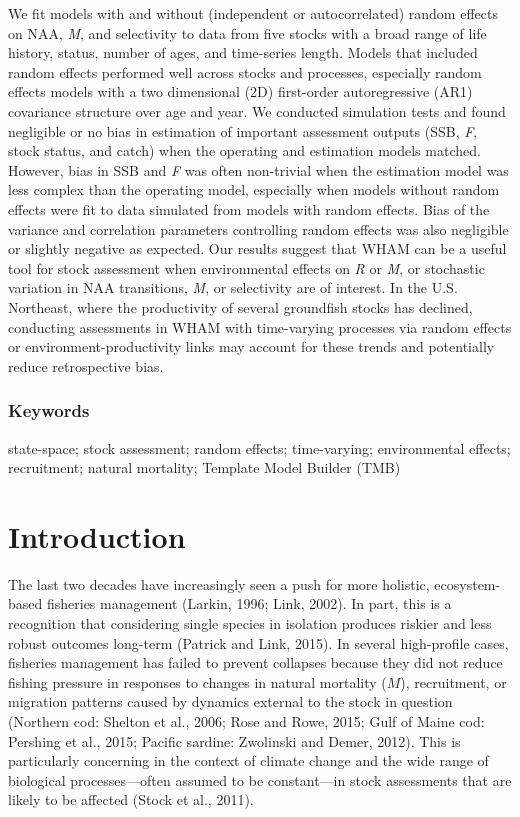 \documentclass[]{article}
\begin{document}
We fit models with and without (independent or autocorrelated) random
effects on NAA, \emph{M}, and selectivity to data from five stocks with
a broad range of life history, status, number of ages, and time-series
length. Models that included random effects performed well across stocks
and processes, especially random effects models with a two dimensional
(2D) first-order autoregressive (AR1) covariance structure over age and
year. We conducted simulation tests and found negligible or no bias in
estimation of important assessment outputs (SSB, \emph{F}, stock status,
and catch) when the operating and estimation models matched. However,
bias in SSB and \emph{F} was often non-trivial when the estimation model
was less complex than the operating model, especially when models
without random effects were fit to data simulated from models with
random effects. Bias of the variance and correlation parameters
controlling random effects was also negligible or slightly negative as
expected. Our results suggest that WHAM can be a useful tool for stock
assessment when environmental effects on \emph{R} or \emph{M}, or
stochastic variation in NAA transitions, \emph{M}, or selectivity are of
interest. In the U.S. Northeast, where the productivity of several
groundfish stocks has declined, conducting assessments in WHAM with
time-varying processes via random effects or environment-productivity
links may account for these trends and potentially reduce retrospective
bias.

\hypertarget{keywords}{%
\subsubsection*{Keywords}\label{keywords}}

state-space; stock assessment; random effects; time-varying;
environmental effects; recruitment; natural mortality; Template Model
Builder (TMB)

\pagebreak

\hypertarget{introduction}{%
\section{Introduction}\label{introduction}}

The last two decades have increasingly seen a push for more holistic,
ecosystem-based fisheries management (Larkin, 1996; Link, 2002). In
part, this is a recognition that considering single species in isolation
produces riskier and less robust outcomes long-term (Patrick and Link,
2015). In several high-profile cases, fisheries management has failed to
prevent collapses because they did not reduce fishing pressure in
responses to changes in natural mortality (\(M\)), recruitment, or
migration patterns caused by dynamics external to the stock in question
(Northern cod: Shelton et al., 2006; Rose and Rowe, 2015; Gulf of Maine
cod: Pershing et al., 2015; Pacific sardine: Zwolinski and Demer, 2012).
This is particularly concerning in the context of climate change and the
wide range of biological processes---often assumed to be constant---in
stock assessments that are likely to be affected (Stock et al., 2011).
\end{document}
